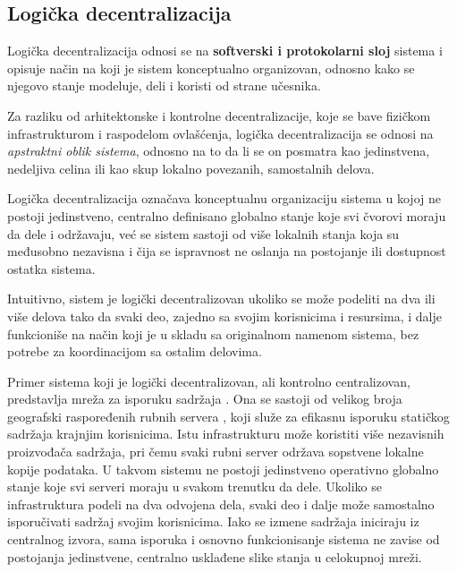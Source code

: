 \subsection{Logička decentralizacija}
Logička decentralizacija odnosi se na \textbf{softverski i protokolarni sloj} sistema i opisuje način na koji je sistem konceptualno organizovan, odnosno kako se njegovo stanje modeluje, deli i koristi od strane učesnika.

Za razliku od arhitektonske i kontrolne decentralizacije, koje se bave fizičkom infrastrukturom i raspodelom ovlašćenja, logička decentralizacija se odnosi na \textit{apstraktni oblik sistema}, odnosno na to da li se on posmatra kao jedinstvena, nedeljiva celina ili kao skup lokalno povezanih, samostalnih delova.

\begin{definicija}
Logička decentralizacija označava konceptualnu organizaciju sistema u kojoj ne postoji jedinstveno, centralno definisano globalno stanje koje svi čvorovi moraju da dele i održavaju, već se sistem sastoji od više lokalnih stanja koja su međusobno nezavisna i čija se ispravnost ne oslanja na postojanje ili dostupnost ostatka sistema.
\end{definicija}

Intuitivno, sistem je logički decentralizovan ukoliko se može podeliti na dva ili više delova tako da svaki deo, zajedno sa svojim korisnicima i resursima, i dalje funkcioniše na način koji je u skladu sa originalnom namenom sistema, bez potrebe za koordinacijom sa ostalim delovima.

Primer sistema koji je logički decentralizovan, ali kontrolno centralizovan, predstavlja mreža za isporuku sadržaja \cite{pathan2007taxonomy} . Ona se sastoji od velikog broja geografski raspoređenih rubnih servera , koji služe za efikasnu isporuku statičkog sadržaja krajnjim korisnicima. Istu infrastrukturu može koristiti više nezavisnih proizvođača sadržaja, pri čemu svaki rubni server održava sopstvene lokalne kopije podataka. U takvom sistemu ne postoji jedinstveno operativno globalno stanje koje svi serveri moraju u svakom trenutku da dele. Ukoliko se infrastruktura podeli na dva odvojena dela, svaki deo i dalje može samostalno isporučivati sadržaj svojim korisnicima. Iako se izmene sadržaja iniciraju iz centralnog izvora, sama isporuka i osnovno funkcionisanje sistema ne zavise od postojanja jedinstvene, centralno usklađene slike stanja u celokupnoj mreži.

